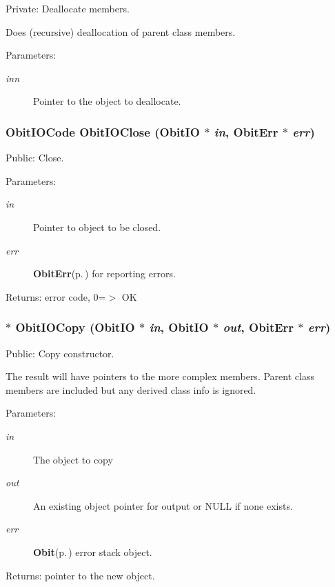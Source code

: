 Private: Deallocate members. 

Does (recursive) deallocation of parent class members. \begin{Desc}
\item[Parameters:]
\begin{description}
\item[{\em inn}]Pointer to the object to deallocate. \end{description}
\end{Desc}
\subsubsection{\setlength{\rightskip}{0pt plus 5cm}Obit\-IOCode Obit\-IOClose ({\bf Obit\-IO} $\ast$ {\em in}, {\bf Obit\-Err} $\ast$ {\em err})}\label{ObitIO_8c_a13}


Public: Close. 

\begin{Desc}
\item[Parameters:]
\begin{description}
\item[{\em in}]Pointer to object to be closed. \item[{\em err}]{\bf Obit\-Err}{\rm (p.\,\pageref{structObitErr})} for reporting errors. \end{description}
\end{Desc}
\begin{Desc}
\item[Returns:]error code, 0=$>$ OK \end{Desc}
\subsubsection{$\ast$ Obit\-IOCopy ({\bf Obit\-IO} $\ast$ {\em in}, {\bf Obit\-IO} $\ast$ {\em out}, {\bf Obit\-Err} $\ast$ {\em err})}\label{ObitIO_8c_a11}


Public: Copy constructor. 

The result will have pointers to the more complex members. Parent class members are included but any derived class info is ignored. \begin{Desc}
\item[Parameters:]
\begin{description}
\item[{\em in}]The object to copy \item[{\em out}]An existing object pointer for output or NULL if none exists. \item[{\em err}]{\bf Obit}{\rm (p.\,\pageref{structObit})} error stack object. \end{description}
\end{Desc}
\begin{Desc}
\item[Returns:]pointer to the new object. \end{Desc}
